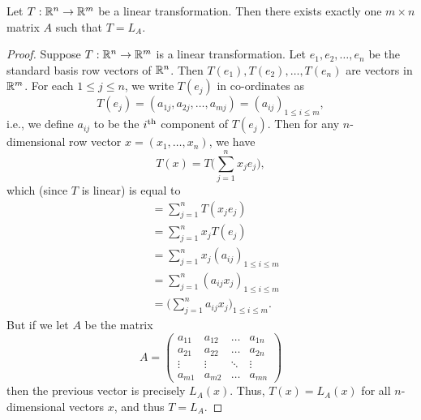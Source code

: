 \setcounter{thm}{12}
\begin{lem}\label{ii:6.1.13}
  Let \(T : \mathbb{R}^n \to \mathbb{R}^m\) be a linear transformation.
  Then there exists exactly one \(m \times n\) matrix \(A\) such that \(T = L_A\).
\end{lem}

\begin{proof}
  Suppose \(T : \mathbb{R}^n \to \mathbb{R}^m\) is a linear transformation.
  Let \(e_1, e_2, \dots, e_n\) be the standard basis row vectors of \(\mathbb{R}^n\).
  Then \(T(e_1), T(e_2), \dots, T(e_n)\) are vectors in \(\mathbb{R}^m\).
  For each \(1 \leq j \leq n\), we write \(T(e_j)\) in co-ordinates as
  \[
    T(e_j) = (a_{1j}, a_{2j}, \dots, a_{mj}) = (a_{ij})_{1 \leq i \leq m},
  \]
  i.e., we define \(a_{ij}\) to be the \(i^{\operatorname{th}}\) component of \(T(e_j)\).
  Then for any \(n\)- dimensional row vector \(x = (x_1, \dots, x_n)\), we have
  \[
    T(x) = T\bigg(\sum_{j = 1}^n x_j e_j\bigg),
  \]
  which (since \(T\) is linear) is equal to
  \begin{align*}
     & = \sum_{j = 1}^n T(x_j e_j)                                \\
     & = \sum_{j = 1}^n x_j T(e_j)                                \\
     & = \sum_{j = 1}^n x_j (a_{ij})_{1 \leq i \leq m}            \\
     & = \sum_{j = 1}^n (a_{ij} x_j)_{1 \leq i \leq m}            \\
     & = \bigg(\sum_{j = 1}^n a_{ij} x_j\bigg)_{1 \leq i \leq m}.
  \end{align*}
  But if we let \(A\) be the matrix
  \[
    A = \begin{pmatrix}
      a_{11} & a_{12} & \dots  & a_{1n} \\
      a_{21} & a_{22} & \dots  & a_{2n} \\
      \vdots & \vdots & \ddots & \vdots \\
      a_{m1} & a_{m2} & \dots  & a_{mn}
    \end{pmatrix}
  \]
  then the previous vector is precisely \(L_A(x)\).
  Thus, \(T(x) = L_A(x)\) for all \(n\)-dimensional vectors \(x\), and thus \(T = L_A\).


\end{proof}
